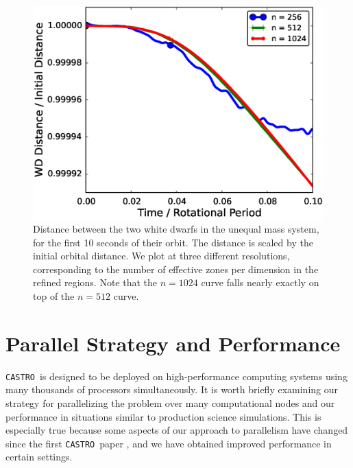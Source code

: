 \documentclass[iop,numberedappendix]{../emulateapj}
\newcommand{\castro}{\texttt{CASTRO}}
\begin{document}
\begin{figure}
  \centering
  \includegraphics[scale=0.45]{plots/spatial_convergence_rot0.eps}
  \caption{Distance between the two white dwarfs in the unequal mass system, for the first 
           10 seconds of their orbit. The distance is scaled by the initial orbital distance. 
           We plot at three different resolutions, corresponding to the number of 
           effective zones per dimension in the refined regions. Note that the $n = 1024$ curve
           falls nearly exactly on top of the $n = 512$ curve.\label{fig:unequal_spatial_convergence}}
\end{figure}



\section{Parallel Strategy and Performance}\label{sec:Performance}

\castro\ is designed to be deployed on high-performance computing systems using 
many thousands of processors simultaneously. It is worth briefly examining 
our strategy for parallelizing the problem over many computational nodes 
and our performance in situations similar to production science simulations. 
This is especially true because some aspects of our approach to parallelism 
have changed since the first \castro\ paper \citep{castro}, and we have obtained improved 
performance in certain settings.
\end{document}
